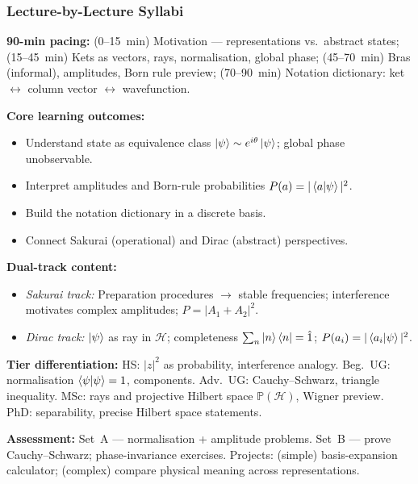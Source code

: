 \documentclass[11pt,a4paper]{article}
\begin{document}
\subsubsection*{Lecture-by-Lecture Syllabi}

\begin{tcolorbox}[modulebox, title={Module~I.2 / L01: Why Dirac Notation? States as Rays \& Superposition}]
\textbf{90-min pacing:} (0--15~min) Motivation --- representations vs.\ abstract states;
(15--45~min) Kets as vectors, rays, normalisation, global phase;
(45--70~min) Bras (informal), amplitudes, Born rule preview;
(70--90~min) Notation dictionary: ket $\leftrightarrow$ column vector $\leftrightarrow$ wavefunction.

\medskip\textbf{Core learning outcomes:}
\begin{itemize}[leftmargin=1.4em,topsep=2pt,itemsep=1pt]
  \item Understand state as equivalence class $\ket{\psi}\sim e^{i\theta}\ket{\psi}$; global phase unobservable.
  \item Interpret amplitudes and Born-rule probabilities $P(a)=|\braket{a|\psi}|^2$.
  \item Build the notation dictionary in a discrete basis.
  \item Connect Sakurai (operational) and Dirac (abstract) perspectives.
\end{itemize}

\medskip\textbf{Dual-track content:}
\begin{itemize}[leftmargin=1.4em,topsep=2pt,itemsep=1pt]
  \item \textit{Sakurai track:} Preparation procedures $\to$ stable frequencies; interference motivates
    complex amplitudes; $P=|A_1+A_2|^2$.
  \item \textit{Dirac track:} $\ket{\psi}$ as ray in $\mathcal{H}$; completeness
    $\sum_n\ket{n}\bra{n}=\hat{1}$; $P(a_i)=|\braket{a_i|\psi}|^2$.
\end{itemize}

\medskip\textbf{Tier differentiation:}
HS: $|z|^2$ as probability, interference analogy.
Beg.\ UG: normalisation $\braket{\psi|\psi}=1$, components.
Adv.\ UG: Cauchy--Schwarz, triangle inequality.
MSc: rays and projective Hilbert space $\mathbb{P}(\mathcal{H})$, Wigner preview.
PhD: separability, precise Hilbert space statements.

\medskip\textbf{Assessment:}
Set~A --- normalisation + amplitude problems.
Set~B --- prove Cauchy--Schwarz; phase-invariance exercises.
Projects: (simple) basis-expansion calculator; (complex) compare physical meaning across representations.
\end{tcolorbox}
\end{document}
